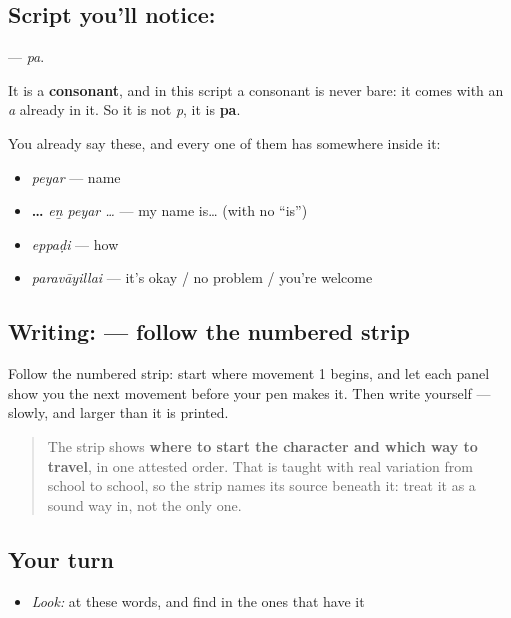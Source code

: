 \subsection*{Script you'll notice: }
\textbf{} — \emph{pa}.

It is a \textbf{consonant}, and in this script a consonant is never bare: it comes with an \emph{a} already in it. So it is not \emph{p}, it is \textbf{pa}.

You already say these, and every one of them has  somewhere inside it:

\begin{itemize}
\raggedright
  \item \textbf{} \emph{peyar} — name
  \item \textbf{  …} \emph{eṉ peyar …} — my name is… (with no \textquotedblleft{}is\textquotedblright{})
  \item \textbf{} \emph{eppaḍi} — how
  \item \textbf{} \emph{paravāyillai} — it's okay / no problem / you're welcome
\end{itemize}

\subsection*{Writing:  — follow the numbered strip}

Follow the numbered strip: start where movement 1 begins, and let each panel show you the next movement before your pen makes it. Then write  yourself — slowly, and larger than it is printed.

\begin{quote}
The strip shows \textbf{where to start the character and which way to travel}, in one attested order. That is taught with real variation from school to school, so the strip names its source beneath it: treat it as a sound way in, not the only one.
\end{quote}

\subsection*{Your turn}
\begin{itemize}
\raggedright
  \item \emph{Look:} at these words, and find  in the ones that have it
\end{itemize}

